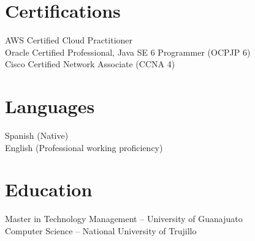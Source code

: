 \documentclass[11pt,a4paper,sans]{moderncv}
\begin{document}
\section{Certifications}
AWS Certified Cloud Practitioner \\
Oracle Certified Professional, Java SE 6 Programmer (OCPJP 6) \\
Cisco Certified Network Associate (CCNA 4)

\section{Languages}
Spanish (Native) \\
English (Professional working proficiency)

\section{Education}
Master in Technology Management – University of Guanajuato \\
Computer Science – National University of Trujillo
\end{document}
